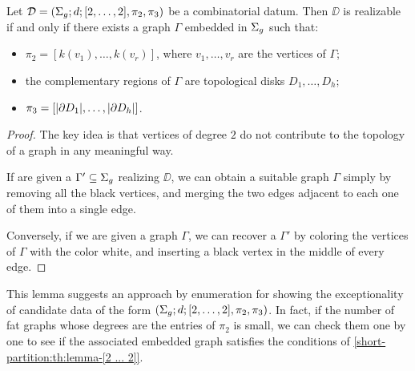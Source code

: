 \begin{lemma}\label{short-partition:th:lemma-[2 ... 2]}
Let $\mathcal{D}=(\Sigma_{g};d;[2,\ldots,2],\pi_2,\pi_3)$ be a combinatorial datum. Then $\DD$ is realizable if and only if there exists a graph $\Gamma$ embedded in $\Sigma_{g}$ such that:
\begin{itemize}
\item $\pi_2=[k(v_1),\ldots,k(v_r)]$, where $v_1,\ldots,v_r$ are the vertices of $\Gamma$;
\item the complementary regions of $\Gamma$ are topological disks $D_1,\ldots,D_h$;
\item $\pi_3=[\lvert \partial D_1\rvert,\ldots,\lvert \partial D_h\rvert]$.
\end{itemize}
\end{lemma}
\begin{proof}
The key idea is that vertices of degree $2$ do not contribute to the topology of a graph in any meaningful way.

If are given a \dessin{} $\Gamma'\subseteq\Sigma_{g}$ realizing $\DD$, we can obtain a suitable graph $\Gamma$ simply by removing all the black vertices, and merging the two edges adjacent to each one of them into a single edge.

Conversely, if we are given a graph $\Gamma$, we can recover a \dessin{} $\Gamma'$ by coloring the vertices of $\Gamma$ with the color white, and inserting a black vertex in the middle of every edge.
\end{proof}

This lemma suggests an approach by enumeration for showing the exceptionality of candidate data of the form $(\Sigma_{g};d;[2,\ldots,2],\pi_2,\pi_3)$. In fact, if the number of fat graphs whose degrees are the entries of $\pi_2$ is small, we can check them one by one to see if the associated embedded graph satisfies the conditions of \cref{short-partition:th:lemma-[2 ... 2]}.


